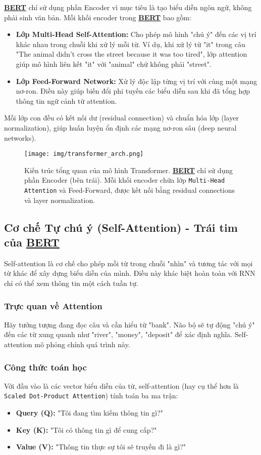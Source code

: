 \hyperref[acro:bert]{\textbf{BERT}} chỉ sử dụng phần Encoder vì mục tiêu là tạo biểu diễn ngôn ngữ, không phải sinh văn bản.
Mỗi khối encoder trong \hyperref[acro:bert]{\textbf{BERT}} bao gồm:
\begin{itemize}
    \item \textbf{Lớp Multi-Head Self-Attention:} Cho phép mô hình "chú ý" đến các vị trí khác nhau trong chuỗi khi xử lý mỗi từ.
    Ví dụ, khi xử lý từ "it" trong câu "The animal didn't cross the street because it was too tired", lớp attention giúp mô hình liên kết "it" với "animal" chứ không phải "street".
    \item \textbf{Lớp Feed-Forward Network:} Xử lý độc lập từng vị trí với cùng một mạng nơ-ron.
    Điều này giúp biến đổi phi tuyến các biểu diễn sau khi đã tổng hợp thông tin ngữ cảnh từ attention.
\end{itemize}

Mỗi lớp con đều có kết nối dư (residual connection) và chuẩn hóa lớp (layer normalization), giúp huấn luyện ổn định các mạng nơ-ron sâu (deep neural networks).
\begin{figure}[H]
    \centering
    \texttt{[image: img/transformer\_arch.png]}
    \caption{Kiến trúc tổng quan của mô hình Transformer.
    \hyperref[acro:bert]{\textbf{BERT}} chỉ sử dụng phần Encoder (bên trái). Mỗi khối encoder chứa lớp \texttt{Multi-Head Attention} và Feed-Forward, được kết nối bằng residual connections và layer normalization.}
    \label{fig:transformer_architecture}
\end{figure}

\subsection{Cơ chế Tự chú ý (Self-Attention) - Trái tim của \hyperref[acro:bert]{\textbf{BERT}}}
\label{ssec:self_attention}
Self-attention là cơ chế cho phép mỗi từ trong chuỗi "nhìn" và tương tác với mọi từ khác để xây dựng biểu diễn của mình.
Điều này khác biệt hoàn toàn với RNN chỉ có thể xem thông tin một cách tuần tự.
\subsubsection{Trực quan về Attention}
Hãy tưởng tượng đang đọc câu và cần hiểu từ "bank".
Não bộ sẽ tự động "chú ý" đến các từ xung quanh như "river", "money", "deposit" để xác định nghĩa.
Self-attention mô phỏng chính quá trình này.

\subsubsection{Công thức toán học}
Với đầu vào là các vector biểu diễn của từ, self-attention (hay cụ thể hơn là \texttt{Scaled Dot-Product Attention}) tính toán ba ma trận:
\begin{itemize}
    \item \textbf{Query (Q):} "Tôi đang tìm kiếm thông tin gì?"
    \item \textbf{Key (K):} "Tôi có thông tin gì để cung cấp?"
    \item \textbf{Value (V):} "Thông tin thực sự tôi sẽ truyền đi là gì?"
\end{itemize}

